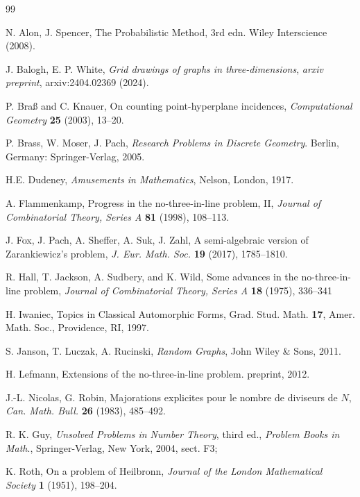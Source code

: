 \documentclass[11pt]{article}
\theoremstyle{plain}
\theoremstyle{definition}
\theoremstyle{remark}
\begin{document}
\begin{thebibliography}{99}



 N. Alon, J. Spencer, The Probabilistic Method, 3rd edn. Wiley Interscience (2008).

 J. Balogh, E. P. White, \emph{Grid drawings of graphs in three-dimensions}, \emph{arxiv preprint}, arxiv:2404.02369 (2024). 

 P. Braß and C. Knauer, On counting point-hyperplane incidences, \emph{Computational 
Geometry} \textbf{25} (2003), 13--20.

  P. Brass, W. Moser, J. Pach, \emph{Research Problems in Discrete Geometry}. Berlin, Germany: Springer-Verlag, 2005.


 H.E. Dudeney, \emph{Amusements in Mathematics}, Nelson, London, 1917. 

 A. Flammenkamp, Progress in the no-three-in-line problem, II, \emph{Journal of Combinatorial 
Theory, Series A} \textbf{81} (1998), 108--113.

 J. Fox, J. Pach, A. Sheffer, A. Suk, J. Zahl, A semi-algebraic version of Zarankiewicz’s problem, \emph{J. Eur. Math. Soc.} \textbf{19} (2017), 1785--1810. 


 R. Hall, T. Jackson, A. Sudbery, and K. Wild, Some advances in the
no-three-in-line problem, \emph{Journal of Combinatorial Theory, Series A} \textbf{18} (1975), 336--341

 H. Iwaniec, Topics in Classical Automorphic Forms, Grad. Stud. Math. \textbf{17}, Amer. Math. Soc., Providence, RI, 1997. %

 S. Janson, T. Luczak, A. Rucinski, \emph{Random Graphs}, John Wiley \& Sons, 2011. 

 H. Lefmann, Extensions of the no-three-in-line problem. preprint, 2012.


 J.-L. Nicolas, G. Robin, Majorations explicites pour le nombre de diviseurs de $N$, \emph{Can. Math. Bull.} \textbf{26} (1983), 485--492. %


 R. K. Guy, \emph{Unsolved Problems in Number Theory}, third ed., \emph{Problem Books in Math}., Springer-Verlag, New York, 2004, sect. F3; %

 K. Roth, On a problem of Heilbronn, \emph{Journal of the London Mathematical Society} \textbf{1} (1951), 198--204.



\end{thebibliography}
\end{document}
